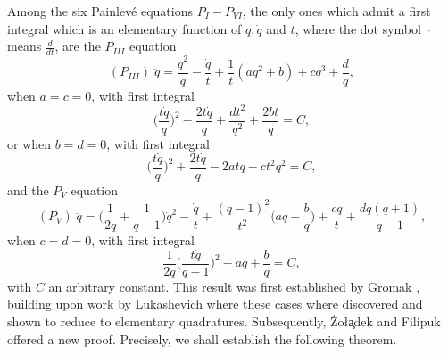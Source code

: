 \documentclass[10pt, reqno]{amsart}
\numberwithin{equation}{section}
\numberwithin{equation}{section}
\begin{document}
Among the six Painlevé equations $P_I-P_{VI}$, the only ones which admit a first integral which is an elementary function of $q,\dot{q}$ and $t$, where the dot symbol $\dot{\quad}$ means $\frac{d}{dt}$, are the $P_{III}$ equation
\begin{equation}
(P_{III})\; \ddot{q}=\frac{\dot{q}^2}{q}-\frac{\dot{q}}{t}+\frac{1}{t}(aq^2+b)+cq^3+\frac{d}{q},\label{P3}
\end{equation}
when $a=c=0$, with first integral
\begin{equation*}
\Big(\frac{t\dot{q}}{q}\Big)^2-\frac{2t\dot{q}}{q}+\frac{dt^2}{q^2}+\frac{2bt}{q}=C,
\end{equation*}
or when $b=d=0$, with first integral
\begin{equation}
\Big(\frac{t\dot{q}}{q}\Big)^2+\frac{2t\dot{q}}{q}-2atq-ct^2q^2=C, \label{FIP32}
\end{equation}
and the $P_V$ equation
\begin{equation}
(P_{V})\;\ddot{q}=\Big(\frac{1}{2q}+\frac{1}{q-1}\Big)\dot{q}^2-\frac{\dot{q}}{t}+\frac{(q-1)^2}{t^2}\Big(aq+\frac{b}{q}\Big)+\frac{cq}{t}+\frac{dq(q+1)}{q-1},\label{P5}
\end{equation}
when $c=d=0$, with first integral
\begin{equation} 
\frac{1}{2q}\Big(\frac{t\dot{q}}{q-1}\Big)^2-aq+\frac{b}{q}=C,\label{FIP5}
\end{equation}
with $C$ an arbitrary constant. This result was first established by Gromak \cite{G1, G2}, building upon work by Lukashevich \cite{Lu} where these cases where discovered and shown to reduce to elementary quadratures. Subsequently, \.Zo\l\c{a}dek and Filipuk \cite{ZF} offered a new proof. Precisely, we shall establish the following theorem.
\end{document}

